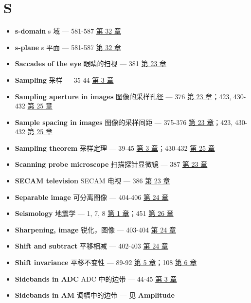 \section{S}

\begin{itemize}
\tightlist
\item
  \textbf{s-domain} s 域 --- 581-587  \hyperref[ch-32]{第 32
  章}
\item
  \textbf{s-plane} s 平面 --- 581-587  \hyperref[ch-32]{第 32
  章}
\item
  \textbf{Saccades of the eye} 眼睛的扫视 --- 381 
  \hyperref[ch-23]{第 23 章}
\item
  \textbf{Sampling} 采样 --- 35-44  \hyperref[ch-03]{第 3 章}
\item
  \textbf{Sampling aperture in images} 图像的采样孔径 --- 376 
  \hyperref[ch-23]{第 23 章}；423, 430-432 
  \hyperref[ch-25]{第 25 章}
\item
  \textbf{Sample spacing in images} 图像的采样间距 --- 375-376
   \hyperref[ch-23]{第 23 章}；423, 430-432 
  \hyperref[ch-25]{第 25 章}
\item
  \textbf{Sampling theorem} 采样定理 --- 39-45 
  \hyperref[ch-03]{第 3 章}；430-432  \hyperref[ch-25]{第 25
  章}
\item
  \textbf{Scanning probe microscope} 扫描探针显微镜 --- 387 
  \hyperref[ch-23]{第 23 章}
\item
  \textbf{SECAM television} SECAM 电视 --- 386 
  \hyperref[ch-23]{第 23 章}
\item
  \textbf{Separable image} 可分离图像 --- 404-406 
  \hyperref[ch-24]{第 24 章}
\item
  \textbf{Seismology} 地震学 --- 1, 7, 8  \hyperref[ch-01]{第
  1 章}；451  \hyperref[ch-26]{第 26 章}
\item
  \textbf{Sharpening, image} 锐化，图像 --- 403-404 
  \hyperref[ch-24]{第 24 章}
\item
  \textbf{Shift and subtract} 平移相减 --- 402-403 
  \hyperref[ch-24]{第 24 章}
\item
  \textbf{Shift invariance} 平移不变性 --- 89-92 
  \hyperref[ch-05]{第 5 章}；108  \hyperref[ch-06]{第 6 章}
\item
  \textbf{Sidebands in ADC} ADC 中的边带 --- 44-45 
  \hyperref[ch-03]{第 3 章}
\item
  \textbf{Sidebands in AM} 调幅中的边带 --- 见 \textbf{Amplitude
}
\end{itemize}
